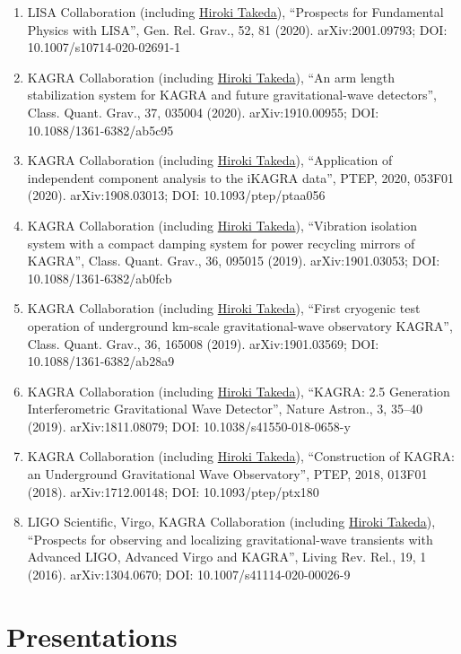 \documentclass[uplatex, 12pt]{article}
\begin{document}
\begin{enumerate}
\item LISA Collaboration (including \uline{Hiroki Takeda}), “Prospects for Fundamental Physics with LISA”, Gen. Rel. Grav., 52, 81 (2020). arXiv:2001.09793; DOI: 10.1007/s10714-020-02691-1
\item KAGRA Collaboration (including \uline{Hiroki Takeda}), “An arm length stabilization system for KAGRA and future gravitational-wave detectors”, Class. Quant. Grav., 37, 035004 (2020). arXiv:1910.00955; DOI: 10.1088/1361-6382/ab5c95
\item KAGRA Collaboration (including \uline{Hiroki Takeda}), “Application of independent component analysis to the iKAGRA data”, PTEP, 2020, 053F01 (2020). arXiv:1908.03013; DOI: 10.1093/ptep/ptaa056
\item KAGRA Collaboration (including \uline{Hiroki Takeda}), “Vibration isolation system with a compact damping system for power recycling mirrors of KAGRA”, Class. Quant. Grav., 36, 095015 (2019). arXiv:1901.03053; DOI: 10.1088/1361-6382/ab0fcb
\item KAGRA Collaboration (including \uline{Hiroki Takeda}), “First cryogenic test operation of underground km-scale gravitational-wave observatory KAGRA”, Class. Quant. Grav., 36, 165008 (2019). arXiv:1901.03569; DOI: 10.1088/1361-6382/ab28a9
\item KAGRA Collaboration (including \uline{Hiroki Takeda}), “KAGRA: 2.5 Generation Interferometric Gravitational Wave Detector”, Nature Astron., 3, 35--40 (2019). arXiv:1811.08079; DOI: 10.1038/s41550-018-0658-y
\item KAGRA Collaboration (including \uline{Hiroki Takeda}), “Construction of KAGRA: an Underground Gravitational Wave Observatory”, PTEP, 2018, 013F01 (2018). arXiv:1712.00148; DOI: 10.1093/ptep/ptx180
\item LIGO Scientific, Virgo, KAGRA Collaboration (including \uline{Hiroki Takeda}), “Prospects for observing and localizing gravitational-wave transients with Advanced LIGO, Advanced Virgo and KAGRA”, Living Rev. Rel., 19, 1 (2016). arXiv:1304.0670; DOI: 10.1007/s41114-020-00026-9
\end{enumerate}


\section*{Presentations}
\end{document}
